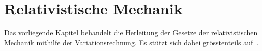 %
%
%
%
%

\chapter{Relativistische Mechanik\label{chapter:relativ}}
\begin{refsection}

Das vorliegende Kapitel behandelt die Herleitung der Gesetze der relativistischen Mechanik
mithilfe der Variationsrechnung.
Es stützt sich dabei grösstenteils auf~\cite{relativ:landau}.






\printbibliography[heading=subbibliography]
\end{refsection}
